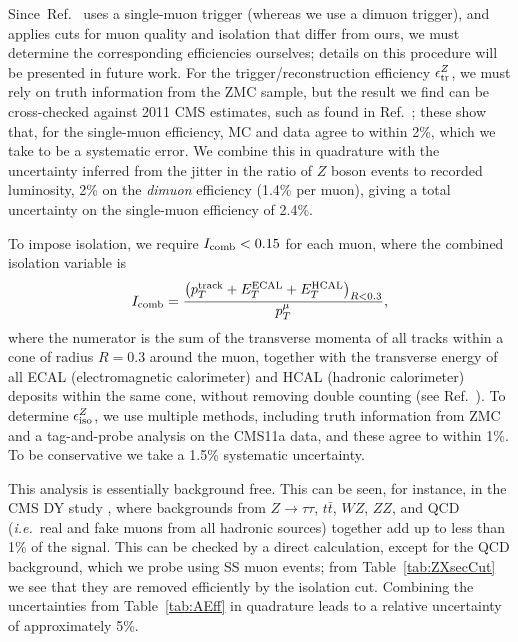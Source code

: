 \documentclass[aps,prd,twocolumn,superscriptaddress,preprintnumbers,nofootinbib,longbibliography,floatfix]{revtex4-1}
\DeclareRobustCommand{\Tab}[1]{Table~\ref{#1}}
\DeclareRobustCommand{\Ref}[1]{Ref.~\cite{#1}}
\begin{document}
Since~\Ref{CMS:2011aa} uses a single-muon trigger (whereas we use a dimuon trigger), and applies cuts for muon quality and isolation that differ from ours, we must determine the corresponding efficiencies ourselves; details on this procedure will be presented in future work.
%
For the trigger/reconstruction efficiency $\epsilon^Z_{\rm tr}$, we must rely on truth information from the ZMC sample, but the result we find can be cross-checked against 2011 CMS estimates, such as found in \Ref{CMSMuonTwiki}; these show that, for the single-muon efficiency, MC and data agree to within 2\%, which we take to be a systematic error.
%
We combine this in quadrature with the uncertainty inferred from the jitter in the ratio of $Z$ boson events to recorded luminosity, 2\% on the {\it dimuon} efficiency (1.4\% per muon), giving a total uncertainty on the single-muon efficiency of 2.4\%. 



To impose isolation, we require $I_{\rm comb}<0.15$ for each muon, where the combined isolation variable is 
%
\begin{equation}
\label{eq:Icomb_def}
I_{\rm comb} = \frac{ \big(p_T^{\rm track} + E_T^{\rm ECAL} + E_T^{\rm HCAL} \big)_{R < 0.3} } {p_T^\mu},
\end{equation}
where the numerator is the sum of the transverse momenta of all tracks within a cone of radius $R=0.3$ around the muon, together with the transverse energy of all ECAL (electromagnetic calorimeter) and HCAL (hadronic calorimeter) deposits within the same cone, without removing double counting (see \Ref{Chatrchyan:2012xi}).
%
To determine $\epsilon^Z_{\rm iso}$, we use multiple methods, including truth information from ZMC and a tag-and-probe analysis on the CMS11a data, and these agree to within 1\%.
%
To be conservative we take a 1.5\% systematic uncertainty.


This analysis is essentially background free.
%
This can be seen, for instance, in the CMS DY study \cite{Chatrchyan:2013tia}, where backgrounds from $Z\to\tau\tau$, $t\bar t$, $WZ$, $ZZ$, and QCD ({\it i.e.}\ real and fake muons from all hadronic sources) together add up to less than 1\% of the signal.
%  
This can be checked by a direct calculation, except for the QCD background, which we probe using SS muon events; from \Tab{tab:ZXsecCut} we see that they are removed efficiently by the isolation cut.
%
Combining the uncertainties from \Tab{tab:AEff} in quadrature leads to a relative uncertainty of approximately 5\%.   
\end{document}
